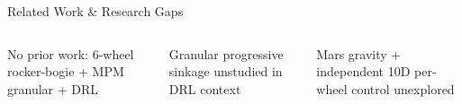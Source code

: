 \documentclass[aspectratio=169, 10pt]{beamer}
\begin{document}
\begin{frame}{Related Work \& Research Gaps}
\vspace{0.2em}
\begin{columns}[T]
\begin{tcolorbox}[mycard, title={\faExclamationCircle\; Gap 1}]
  \tiny No prior work: 6-wheel rocker-bogie + MPM granular + DRL
\end{tcolorbox}
\begin{tcolorbox}[mycard, title={\faExclamationCircle\; Gap 2}]
  \tiny Granular progressive sinkage unstudied in DRL context
\end{tcolorbox}
\begin{tcolorbox}[mycard, title={\faExclamationCircle\; Gap 3}]
  \tiny Mars gravity + independent 10D per-wheel control unexplored
\end{tcolorbox}
\end{columns}
\end{frame}
\end{document}
